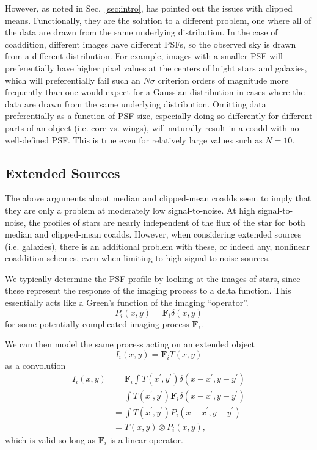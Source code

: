 \documentclass[modern]{style_and_logos/lsstdescnote}
\begin{document}
However, as noted in Sec.~\ref{sec:intro}, \citet{2018PASJ...70S...5B} has pointed out the issues with clipped means.  Functionally, they are the solution to a different problem, one where all of the data are drawn from the same underlying distribution.  In the case of coaddition, different images have different PSFs, so the observed sky is drawn from a different distribution.  For example, images with a smaller PSF will preferentially have higher pixel values at the centers of bright stars and galaxies, which will preferentially fail such an $N\sigma$ criterion orders of magnitude more frequently than one would expect for a Gaussian distribution in cases where the data are drawn from the same underlying distribution.  Omitting data preferentially as a function of PSF size, especially doing so differently for different parts of an object (i.e. core vs. wings), will naturally result in a coadd with no well-defined PSF. This is true even for relatively large values such as $N=10$.  

\subsection{Extended Sources}

The above arguments about median and clipped-mean coadds seem to imply that they are only a
problem at moderately low signal-to-noise.  At high signal-to-noise, the profiles of stars are nearly
independent of the flux of the star for both median and clipped-mean coadds.  
However, when considering extended sources (i.e. galaxies),
there is an additional problem with these, or indeed any, nonlinear coaddition schemes,
even when limiting to high signal-to-noise sources.

We typically determine the PSF profile by looking at the images of stars, since these represent
the response of the imaging process to a delta function.  This essentially acts like a
Green's function of the imaging ``operator''.
\begin{equation}
    P_i(x,y) = \mathbf{F}_i \delta(x,y)
\end{equation}
for some potentially complicated imaging process $\mathbf{F}_i$.

We can then model the same process acting on an extended object
\begin{equation}
    I_i(x,y) = \mathbf{F}_i T(x,y)
\end{equation}
as a convolution
\begin{align}
    I_i(x,y) &= \mathbf{F}_i \int T(x^\prime,y^\prime) \delta(x-x^\prime,y-y^\prime) \nonumber\\
    &= \int T(x^\prime,y^\prime) \mathbf{F}_i \delta(x-x^\prime,y-y^\prime) \nonumber\\
    &= \int T(x^\prime,y^\prime) P_i(x-x^\prime,y-y^\prime) \nonumber\\
    &= T(x,y) \otimes P_i(x,y),
\end{align}
which is valid so long as $\mathbf{F}_i$ is a linear operator.
\end{document}
